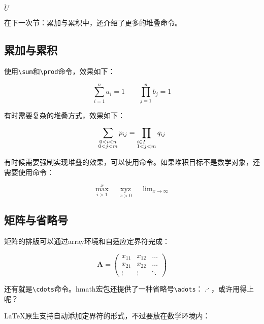 {\begin{codeshow}
$\mathring{U}$
\end{codeshow}

在下一次节：累加与累积中，还介绍了更多的堆叠命令。

\subsection{累加与累积}
使用\verb|\sum|和\verb|\prod|命令，效果如下：

\begin{codeshow}
\[\sum_{i=1}^{n}a_i=1 \qquad
\prod_{j=1}^{n}b_j=1\]
\end{codeshow}

有时需要复杂的堆叠方式，效果如下：

\begin{codeshow}
\[\sum_{\substack{0<i<n \\
  0<j<m}} p_{ij}=
  \prod_{\begin{subarray}{l}
  i\in I \\  1<j<m
  \end{subarray}}q_{ij}\]
\end{codeshow}

有时候需要强制实现堆叠的效果，可以使用\latexline{\\limits}命令。如果堆积目标不是数学对象，还需要使用\latexline{\\mathop}命令：

\begin{codeshow}
\[\max\limits_{i>1}^{x}\quad
\mathop{xyz}\limits_{x>0}\quad
\lim\nolimits_{x\to \infty}\]
\end{codeshow}

\subsection{矩阵与省略号}
矩阵的排版可以通过array环境和自适应定界符完成：

\begin{codeshow}
\[\mathbf{A}=
\left(\begin{array}{ccc}
x_{11} & x_{12} & \ldots \\
x_{21} & x_{22} & \ldots \\
\vdots & \vdots & \ddots
\end{array}\right)\]
\end{codeshow}

还有就是\verb|\cdots|命令。hmath宏包还提供了一种省略号\verb|\adots|：$\adots$，或许用得上呢？

\LaTeX 原生支持自动添加定界符的形式，不过要放在数学环境内：

}
